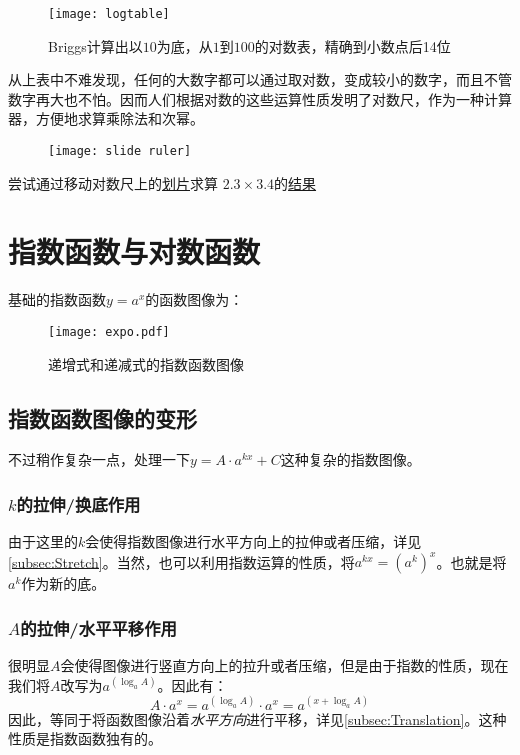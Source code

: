 \begin{figure}[H]
\centering
\texttt{[image: logtable]}
\caption{Briggs计算出以$10$为底，从$1$到$100$的对数表，精确到小数点后14位}
\end{figure}

从上表中不难发现，任何的大数字都可以通过取对数，变成较小的数字，而且不管数字再大也不怕。因而人们根据对数的这些运算性质发明了对数尺，作为一种计算器，方便地求算乘除法和次幂。
\begin{figure}[H]
\centering
\texttt{[image: slide ruler]}
\end{figure}

尝试通过移动对数尺上的\href{http://www.antiquark.com/sliderule/sim/n909es/virtual-n909-es.html}{划片}求算 $2.3 \times 3.4 $的\href{https://sliderulemuseum.com/SR_Course.htm}{结果}
\clearpage

\section{指数函数与对数函数}
基础的指数函数$y=a^x$的函数图像为：
\begin{figure}[H]
\centering
\texttt{[image: expo.pdf]}
\caption{递增式和递减式的指数函数图像}
\end{figure}

\subsection*{指数函数图像的变形}
不过稍作复杂一点，处理一下$y=A\cdot a^{kx} +C$这种复杂的指数图像。

\subsubsection*{$k$的拉伸/换底作用}
由于这里的$k$会使得指数图像进行水平方向上的拉伸或者压缩，详见\ref{subsec:Stretch}。当然，也可以利用指数运算的性质，将$a^{kx}=(a^k)^x$。也就是将$a^k$作为新的底。

\subsubsection*{$A$的拉伸/水平平移作用}
很明显$A$会使得图像进行竖直方向上的拉升或者压缩，但是由于指数的性质，现在我们将$A$改写为$a^{\left(\log_a A\right)}$。因此有：
\[
	A\cdot a^x =a^{\left(\log_a A\right)}\cdot a^x = a^{\left(x+\log_a A\right)}
\]
因此，等同于将函数图像沿着\emph{水平方向}进行平移，详见\ref{subsec:Translation}。这种性质是指数函数独有的。

